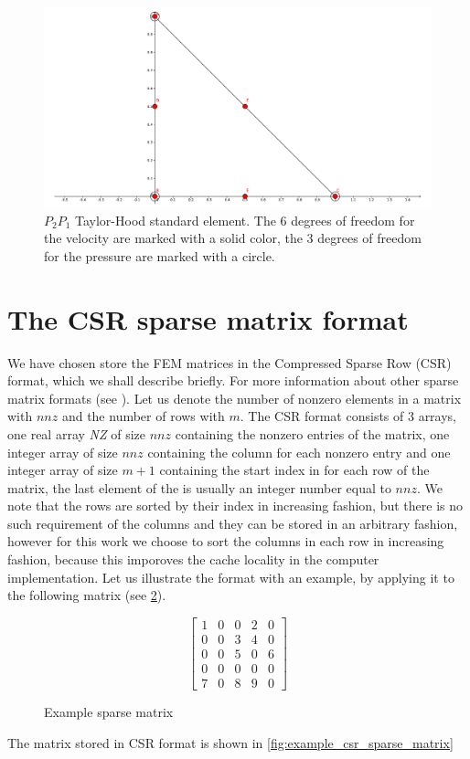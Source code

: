 \begin{figure}[H]
  \centering
  \includegraphics[width=\textwidth]{Figures/01_introduction/tylor_hood_element.pdf}
  \caption{$P_2P_1$ Taylor-Hood standard element. The 6 degrees of freedom for the velocity are marked with a solid color, the 3 degrees of freedom for the pressure are marked with a circle.}\label{fig:P2P1-Standard}
\end{figure}

\section{The CSR sparse matrix format}
We have chosen store the FEM matrices in the Compressed Sparse Row (CSR) format, which we shall describe briefly. For more information about other sparse matrix formats (see \cite{saad-sparse}). Let us denote the number of nonzero elements in a matrix with $nnz$ and the number of rows with $m$. The CSR format consists of 3 arrays, one real array \textit{NZ} of size $nnz$ containing the nonzero entries of the matrix, one integer array  of size $nnz$ containing the column for each nonzero entry and one integer array  of size $m + 1$ containing the start index in  for each row of the matrix, the last element of the  is usually an integer number equal to $nnz$. We note that the rows are sorted by their index in increasing fashion, but there is no such requirement of the columns and they can be stored in an arbitrary fashion, however for this work we choose to sort the columns in each row in increasing fashion, because this imporoves the cache locality in the computer implementation. Let us illustrate the format with an example, by applying it to the following matrix (see \cref{fig:example_sparse_matrix}).
\begin{figure}[H]
$$
\begin{bmatrix}
	1 & 0 & 0 & 2 & 0\\
	0 & 0 & 3 & 4 & 0\\
	0 & 0 & 5 & 0 & 6\\
	0 & 0 & 0 & 0 & 0\\
	7 & 0 & 8 & 9 & 0
\end{bmatrix}
$$
\caption{Example sparse matrix}\label{fig:example_sparse_matrix}
\end{figure}
The matrix stored in CSR format is shown in \cref{fig:example_csr_sparse_matrix}


